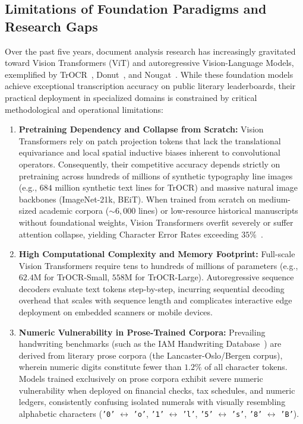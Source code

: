 \documentclass{IEEEtran}
\begin{document}
\subsection{Limitations of Foundation Paradigms and Research Gaps}

Over the past five years, document analysis research has increasingly gravitated toward Vision Transformers (ViT) and autoregressive Vision-Language Models, exemplified by TrOCR~\cite{li2023trocr}, Donut~\cite{kim2022donut}, and Nougat~\cite{blecher2023nougat}. While these foundation models achieve exceptional transcription accuracy on public literary leaderboards, their practical deployment in specialized domains is constrained by critical methodological and operational limitations:

\begin{enumerate}

    \item \textbf{Pretraining Dependency and Collapse from Scratch:} Vision Transformers rely on patch projection tokens that lack the translational equivariance and local spatial inductive biases inherent to convolutional operators. Consequently, their competitive accuracy depends strictly on pretraining across hundreds of millions of synthetic typography line images (e.g., $684$ million synthetic text lines for TrOCR) and massive natural image backbones (ImageNet-21k, BEiT). When trained from scratch on medium-sized academic corpora ($\sim 6,000$ lines) or low-resource historical manuscripts without foundational weights, Vision Transformers overfit severely or suffer attention collapse, yielding Character Error Rates exceeding $35\%$~\cite{diaz2022rethinking, kang2023evaluating, li2025htr}.

    \item \textbf{High Computational Complexity and Memory Footprint:} Full-scale Vision Transformers require tens to hundreds of millions of parameters (e.g., $62.4\text{M}$ for TrOCR-Small, $558\text{M}$ for TrOCR-Large). Autoregressive sequence decoders evaluate text tokens step-by-step, incurring sequential decoding overhead that scales with sequence length and complicates interactive edge deployment on embedded scanners or mobile devices.

    \item \textbf{Numeric Vulnerability in Prose-Trained Corpora:} Prevailing handwriting benchmarks (such as the IAM Handwriting Database~\cite{marti2002iam}) are derived from literary prose corpora (the Lancaster-Oslo/Bergen corpus), wherein numeric digits constitute fewer than $1.2\%$ of all character tokens. Models trained exclusively on prose corpora exhibit severe numeric vulnerability when deployed on financial checks, tax schedules, and numeric ledgers, consistently confusing isolated numerals with visually resembling alphabetic characters (\texttt{'0'} $\leftrightarrow$ \texttt{'o'}, \texttt{'1'} $\leftrightarrow$ \texttt{'l'}, \texttt{'5'} $\leftrightarrow$ \texttt{'s'}, \texttt{'8'} $\leftrightarrow$ \texttt{'B'}).


\end{enumerate}
\end{document}
